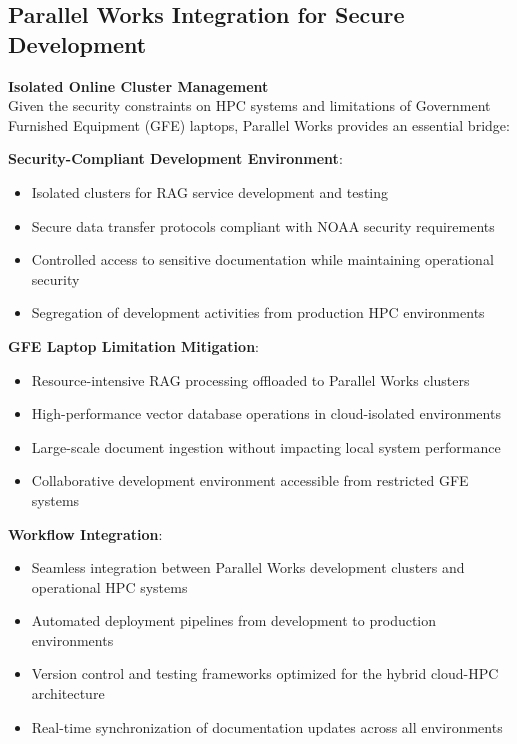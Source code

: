 \documentclass[11pt,letterpaper]{article}
\begin{document}
\subsection{Parallel Works Integration for Secure Development}

\textbf{Isolated Online Cluster Management}\\
Given the security constraints on HPC systems and limitations of Government Furnished Equipment (GFE) laptops, Parallel Works provides an essential bridge:

\begin{center}
\end{center}

\textbf{Security-Compliant Development Environment}:
\begin{itemize}
    \item Isolated clusters for RAG service development and testing
    \item Secure data transfer protocols compliant with NOAA security requirements
    \item Controlled access to sensitive documentation while maintaining operational security
    \item Segregation of development activities from production HPC environments
\end{itemize}

\textbf{GFE Laptop Limitation Mitigation}:
\begin{itemize}
    \item Resource-intensive RAG processing offloaded to Parallel Works clusters
    \item High-performance vector database operations in cloud-isolated environments
    \item Large-scale document ingestion without impacting local system performance
    \item Collaborative development environment accessible from restricted GFE systems
\end{itemize}

\textbf{Workflow Integration}:
\begin{itemize}
    \item Seamless integration between Parallel Works development clusters and operational HPC systems
    \item Automated deployment pipelines from development to production environments
    \item Version control and testing frameworks optimized for the hybrid cloud-HPC architecture
    \item Real-time synchronization of documentation updates across all environments
\end{itemize}
\end{document}
